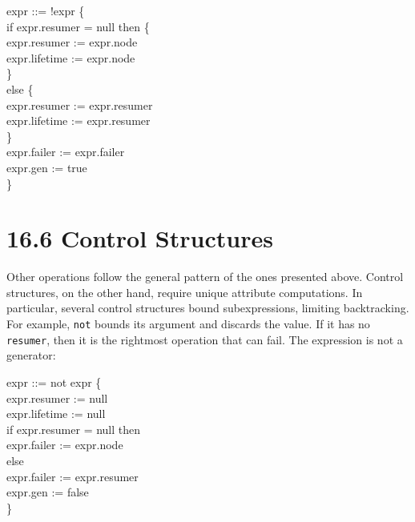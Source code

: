 \goodbreak
\begin{iconcode}
\>expr ::= !expr \{\\
\>\>\>\>if expr.resumer = null then \{\\
\>\>\>\>\>expr.resumer := expr.node\\
\>\>\>\>\>expr.lifetime := expr.node\\
\>\>\>\>\>\}\\
\>\>\>\>else \{\\
\>\>\>\>\>expr.resumer := expr.resumer\\
\>\>\>\>\>expr.lifetime := expr.resumer\\
\>\>\>\>\>\}\\
\>\>\>\>expr.failer := expr.failer\\
\>\>\>\>expr.gen := true\\
\>\>\>\>\}\\
\end{iconcode}


\section[16.6 Control Structures]{16.6 Control Structures}

Other operations follow the general pattern of the ones presented
above. Control structures, on the other hand, require unique attribute
computations. In particular, several control structures bound
subexpressions, limiting backtracking.  For example, \texttt{not}
bounds its argument and discards the value. If it has no
\texttt{resumer}, then it is the rightmost operation that can
fail. The expression is not a generator:

\goodbreak
\begin{iconcode}
\>expr ::= not expr \{\\
\>\>\>\>expr.resumer := null\\
\>\>\>\>expr.lifetime := null\\
\>\>\>\>if expr.resumer = null then\\
\>\>\>\>\>expr.failer := expr.node\\
\>\>\>\>else\\
\>\>\>\>\>expr.failer := expr.resumer\\
\>\>\>\>expr.gen := false\\
\>\>\>\>\}\\
\end{iconcode}


